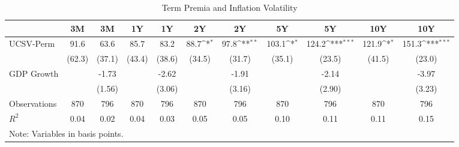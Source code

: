 \begin{table}[htbp]\centering
\def\sym#1{\ifmmode^{#1}\else\(^{#1}\)\fi}
\caption{Term Premia and Inflation Volatility}
\label{tab:tpucsv}
\begin{tabular*}{0.8\hsize}{@{\hskip\tabcolsep\extracolsep\fill}l*{10}{c}}
\toprule
                    &\multicolumn{1}{c}{3M}&\multicolumn{1}{c}{3M}&\multicolumn{1}{c}{1Y}&\multicolumn{1}{c}{1Y}&\multicolumn{1}{c}{2Y}&\multicolumn{1}{c}{2Y}&\multicolumn{1}{c}{5Y}&\multicolumn{1}{c}{5Y}&\multicolumn{1}{c}{10Y}&\multicolumn{1}{c}{10Y}\\
\midrule
UCSV-Perm           &        91.6         &        63.6         &        85.7         &        83.2         &        88.7\sym{*}  &        97.8\sym{**} &       103.1\sym{*}  &       124.2\sym{***}&       121.9\sym{*}  &       151.3\sym{***}\\
                    &      (62.3)         &      (37.1)         &      (43.4)         &      (38.6)         &      (34.5)         &      (31.7)         &      (35.1)         &      (23.5)         &      (41.5)         &      (23.0)         \\
\addlinespace
GDP Growth          &                     &       -1.73         &                     &       -2.62         &                     &       -1.91         &                     &       -2.14         &                     &       -3.97         \\
                    &                     &      (1.56)         &                     &      (3.06)         &                     &      (3.16)         &                     &      (2.90)         &                     &      (3.23)         \\
\midrule
Observations        &         870         &         796         &         870         &         796         &         870         &         796         &         870         &         796         &         870         &         796         \\
\(R^{2}\)           &        0.04         &        0.02         &        0.04         &        0.03         &        0.05         &        0.05         &        0.10         &        0.11         &        0.11         &        0.15         \\
\bottomrule
\multicolumn{11}{l}{\footnotesize Note: Variables in basis points.}\\
\end{tabular*}
\end{table}
